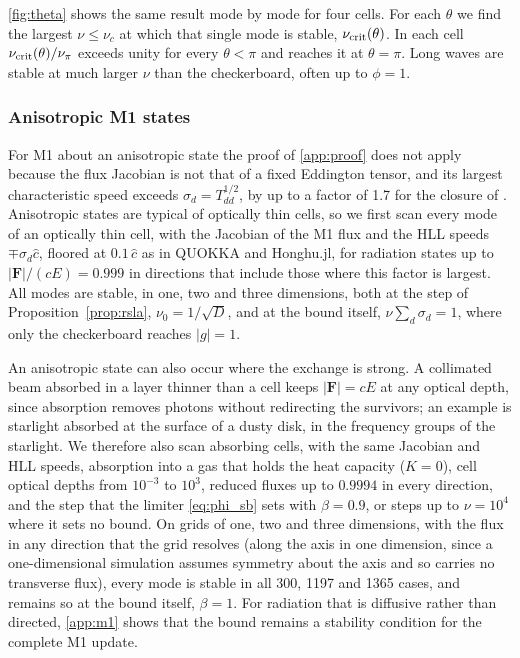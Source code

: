 \documentclass[preprint,12pt,authoryear]{elsarticle}
\newcommand{\vecF}{\mathbf{F}}
\begin{document}
\begin{appendix}
\autoref{fig:theta} shows the same result mode by mode for four cells. For each $\theta$ we find the largest $\nu \leq \nu_c$ at which that single mode is stable, $\nu_{\rm crit}(\theta)$. In each cell $\nu_{\rm crit}(\theta)/\nu_\pi$ exceeds unity for every $\theta < \pi$ and reaches it at $\theta = \pi$. Long waves are stable at much larger $\nu$ than the checkerboard, often up to $\phi = 1$.

\subsubsection{Anisotropic M1 states}

For M1 about an anisotropic state the proof of \ref{app:proof} does not apply because the flux Jacobian is not that of a fixed Eddington tensor, and its largest characteristic speed exceeds $\sigma_d = T_{dd}^{1/2}$, by up to a factor of 1.7 for the closure of \citet{Levermore84a}. Anisotropic states are typical of optically thin cells, so we first scan every mode of an optically thin cell, with the Jacobian of the M1 flux and the HLL speeds $\mp\sigma_d\hat{c}$, floored at $0.1\,\hat{c}$ as in QUOKKA and Honghu.jl, for radiation states up to $|\vecF|/(cE) = 0.999$ in directions that include those where this factor is largest. All modes are stable, in one, two and three dimensions, both at the step of Proposition~\ref{prop:rsla}, $\nu_0 = 1/\sqrt{D}$, and at the bound itself, $\nu\sum_d\sigma_d = 1$, where only the checkerboard reaches $|g| = 1$.

An anisotropic state can also occur where the exchange is strong. A collimated beam absorbed in a layer thinner than a cell keeps $|\vecF| = cE$ at any optical depth, since absorption removes photons without redirecting the survivors; an example is starlight absorbed at the surface of a dusty disk, in the frequency groups of the starlight. We therefore also scan absorbing cells, with the same Jacobian and HLL speeds, absorption into a gas that holds the heat capacity ($K = 0$), cell optical depths from $10^{-3}$ to $10^3$, reduced fluxes up to $0.9994$ in every direction, and the step that the limiter \autoref{eq:phi_sb} sets with $\beta = 0.9$, or steps up to $\nu = 10^4$ where it sets no bound. On grids of one, two and three dimensions, with the flux in any direction that the grid resolves (along the axis in one dimension, since a one-dimensional simulation assumes symmetry about the axis and so carries no transverse flux), every mode is stable in all 300, 1197 and 1365 cases, and remains so at the bound itself, $\beta = 1$. For radiation that is diffusive rather than directed, \ref{app:m1} shows that the bound remains a stability condition for the complete M1 update.


\end{appendix}
\end{document}
